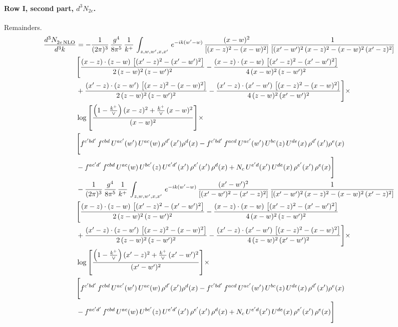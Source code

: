 \documentclass[10pt]{article}
\numberwithin{equation}{section}
\begin{document}
\paragraph{Row I, second part, $d^3N_{2e}$.}
Remainders.
\begin{align}
 \frac{d^{3}N_{2e\,\rm NLO}^{\rm}}{d^{3}k}  & =   -\frac{1}{(2\pi)^{3}}\, \frac{g^{4}}{8\pi^{5}}\,\frac{1}{k^{+}}\,\int_{z,w,w^{\prime},x,x'}\, e^{-ik(w^{\prime}-w)}\,\frac{(x-w)^{2}}{\left[(x-z)^{2}-(x-w)^{2}\right]}\, \frac{1}{\left[(x'-w')^{2}\, (x-z)^{2} - (x-w)^{2}\, (x'-z)^{2}\right]} \notag \\ & \Bigg[\frac{(x-z)\cdot (z-w)\, \left[(x'-z)^{2}-(x'-w')^{2}\right]}{2\, (z-w)^{2}\, (z-w')^{2}}  - \frac{(x-z)\cdot (x-w)\,\left[(x'-z)^{2}-(x'-w')^{2}\right] }{4\,(x-w)^{2}\,(z-w')^{2}}\notag \\ & +\frac{(x'-z)\cdot (z-w')\, \left[(x-z)^{2}-(x-w)^{2}\right]}{2\, (z-w)^{2}\, (z-w')^{2}}-\frac{(x'-z)\cdot (x'-w')\, \left[(x-z)^{2}-(x-w)^{2}\right]}{4\, (z-w)^{2}\,(x'-w')^{2}}\Bigg]\times\,\notag \\ & \log{\left[\frac{\left(1-\frac{k^{+}}{\vee}\right)(x-z)^{2}+\frac{k^{+}}{\vee}\,(x-w)^{2}}{(x-w)^{2}}\right]}\times\,\notag \\ & \Bigg[f^{c'bd'}\,f^{cbd}\, U^{ac'}(w')\,U^{ac}(w)\,\rho^{d'}(x')\rho^{d}(x)- f^{c'bd'}\,f^{acd}\,U^{ac'}(w')\,U^{bc}(z)\,U^{de}(x)\,\rho^{d'}(x')\rho^{e}(x) \notag \\ & -f^{ac'd'}\,f^{cbd}\,U^{ac}(w)\,U^{bc'}(z)\,U^{e'd'}(x')\,\rho^{e'}(x')\,\rho^{d}(x) +N_{c}\,U^{e'd}(x')\,U^{de}(x)\,\rho^{e'}(x')\,\rho^{e}(x)\Bigg] \notag \\
& -\frac{1}{(2\pi)^{3}}\, \frac{g^{4}}{8\pi^{5}}\,\frac{1}{k^{+}}\,\int_{z,w,w^{\prime},x,x'}\, e^{-ik(w^{\prime}-w)}\, \frac{(x'-w')^{2}}{\left[(x'-w')^{2}-(x'-z)^{2}\right]}\, \frac{1}{\left[(x'-w')^{2}\, (x-z)^{2} - (x-w)^{2}\, (x'-z)^{2}\right]}  \notag \\ & \Bigg[\frac{(x-z)\cdot (z-w)\, \left[(x'-z)^{2}-(x'-w')^{2}\right]}{2\, (z-w)^{2}\, (z-w')^{2}}  - \frac{(x-z)\cdot (x-w)\,\left[(x'-z)^{2}-(x'-w')^{2}\right] }{4\,(x-w)^{2}\,(z-w')^{2}}\notag \\ & +\frac{(x'-z)\cdot (z-w')\, \left[(x-z)^{2}-(x-w)^{2}\right]}{2\, (z-w)^{2}\, (z-w')^{2}}-\frac{(x'-z)\cdot (x'-w')\, \left[(x-z)^{2}-(x-w)^{2}\right]}{4\, (z-w)^{2}\,(x'-w')^{2}}\Bigg]\times\,\notag \\ & \log{\left[\frac{\left(1-\frac{k^{+}}{\vee}\right)(x'-z)^{2}+\frac{k^{+}}{\vee}\,(x'-w')^{2}}{(x'-w')^{2}}\right]}\times\notag \\ & \Bigg[f^{c'bd'}\,f^{cbd}\, U^{ac'}(w')\,U^{ac}(w)\,\rho^{d'}(x')\rho^{d}(x)- f^{c'bd'}\,f^{acd}\,U^{ac'}(w')\,U^{bc}(z)\,U^{de}(x)\,\rho^{d'}(x')\rho^{e}(x) \notag \\ & -f^{ac'd'}\,f^{cbd}\,U^{ac}(w)\,U^{bc'}(z)\,U^{e'd'}(x')\,\rho^{e'}(x')\,\rho^{d}(x) +N_{c}\,U^{e'd}(x')\,U^{de}(x)\,\rho^{e'}(x')\,\rho^{e}(x)\Bigg] \label{eq:R:G2I2e}
\end{align}
\end{document}
